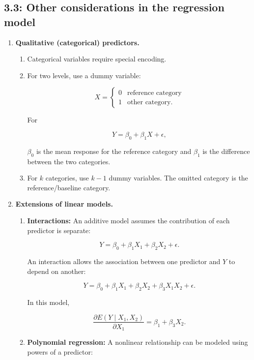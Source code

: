 \documentclass{article}
\begin{document}
\subsection*{3.3: Other considerations in the regression model}

\begin{enumerate}

\item \textbf{Qualitative (categorical) predictors.}
\begin{enumerate}
\item Categorical variables require special encoding.

\item For two levels, use a dummy variable:

$$
X=
\begin{cases}
0 & \text{reference category}\\
1 & \text{other category}.
\end{cases}
$$

For

$$
Y=\beta_0+\beta_1X+\epsilon,
$$

$\beta_0$ is the mean response for the reference category and $\beta_1$ is the difference between the two categories.

\item For $k$ categories, use $k-1$ dummy variables. The omitted category is the reference/baseline category.
\end{enumerate}

\item \textbf{Extensions of linear models.}
\begin{enumerate}
\item \textbf{Interactions:} An additive model assumes the contribution of each predictor is separate:

$$
Y=\beta_0+\beta_1X_1+\beta_2X_2+\epsilon.
$$

An interaction allows the association between one predictor and $Y$ to depend on another:

$$
Y=\beta_0+\beta_1X_1+\beta_2X_2+\beta_3X_1X_2+\epsilon.
$$

In this model,

$$
\frac{\partial E(Y\mid X_1,X_2)}{\partial X_1}
=
\beta_1+\beta_3X_2.
$$

\item \textbf{Polynomial regression:} A nonlinear relationship can be modeled using powers of a predictor:


\end{enumerate}
\end{enumerate}
\end{document}
